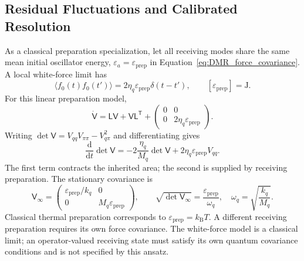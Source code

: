 \subsection{Residual Fluctuations and Calibrated Resolution}

As a classical preparation specialization, let all receiving modes share the same mean initial oscillator energy, $\varepsilon_a=\varepsilon_{\mathrm{prep}}$ in Equation~\eqref{eq:DMR_force_covariance}. A local white-force limit has
\begin{equation}
 \langle f_0(t)f_0(t')\rangle=2\eta_q\varepsilon_{\mathrm{prep}}\delta(t-t'),
 \qquad [\varepsilon_{\mathrm{prep}}]=\mathrm J.
\end{equation}
For this linear preparation model,
\begin{equation}
 \dot{\mathsf V}=\mathsf L\mathsf V+\mathsf V\mathsf L^{\mathsf T}
 +\begin{pmatrix}0&0\\0&2\eta_q\varepsilon_{\mathrm{prep}}\end{pmatrix}.
\label{eq:DMR_prepared_covariance_evolution}
\end{equation}
Writing $\det\mathsf V=V_{qq}V_{\pi\pi}-V_{q\pi}^2$ and differentiating gives
\begin{equation}
 \boxed{
 \frac{\mathrm d}{\mathrm dt}\det\mathsf V
 =-2\frac{\eta_q}{M_q}\det\mathsf V
 +2\eta_q\varepsilon_{\mathrm{prep}}V_{qq}
 }.
\label{eq:DMR_prepared_area_law}
\end{equation}
The first term contracts the inherited area; the second is supplied by receiving preparation. The stationary covariance is
\begin{equation}
 \mathsf V_\infty=
 \begin{pmatrix}
 \varepsilon_{\mathrm{prep}}/k_q&0\\
 0&M_q\varepsilon_{\mathrm{prep}}
 \end{pmatrix},
 \qquad
 \sqrt{\det\mathsf V_\infty}
 =\frac{\varepsilon_{\mathrm{prep}}}{\omega_q},
 \quad\omega_q=\sqrt{\frac{k_q}{M_q}}.
\label{eq:DMR_stationary_preparation}
\end{equation}
Classical thermal preparation corresponds to $\varepsilon_{\mathrm{prep}}=k_{\mathrm B}T$. A different receiving preparation requires its own force covariance. The white-force model is a classical limit; an operator-valued receiving state must satisfy its own quantum covariance conditions and is not specified by this ansatz.

